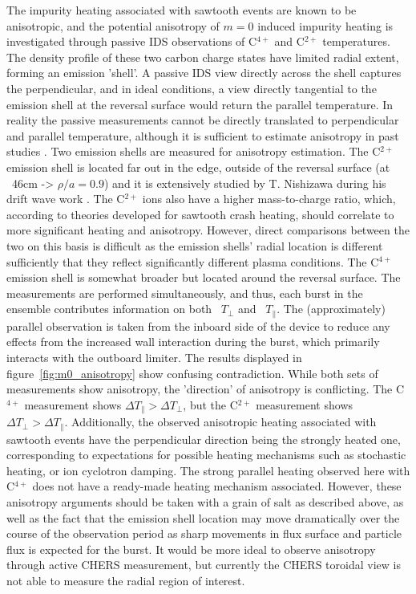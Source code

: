 \begin{refsection}
The impurity heating associated with sawtooth events are known to be anisotropic, and the potential anisotropy of $m = 0$ induced impurity heating is investigated through passive IDS observations of C$^{4+}$ and C$^{2+}$ temperatures. The density profile of these two carbon charge states have limited radial extent, forming an emission 'shell'. A passive IDS view directly across the shell captures the perpendicular, and in ideal conditions, a view directly tangential to the emission shell at the reversal surface would return the parallel temperature. In reality the passive measurements cannot be directly translated to perpendicular and parallel temperature, although it is sufficient to estimate anisotropy in past studies \cite{Anisotropy_papers}. Two emission shells are measured for anisotropy estimation. The C$^{2+}$ emission shell is located far out in the edge, outside of the reversal surface (at ~46cm -> $\rho/a = 0.9$) and it is extensively studied by T. Nishizawa during his drift wave work \cite{Nishizawa2018, Nishizawa2018b}. The C$^{2+}$ ions also have a higher mass-to-charge ratio, which, according to theories developed for sawtooth crash heating, should correlate to more significant heating and anisotropy\cite{Fiksel2009,Tangri}. However, direct comparisons between the two on this basis is difficult as the emission shells' radial location is different sufficiently that they reflect significantly different plasma conditions. The C$^{4+}$ emission shell is somewhat broader but located around the reversal surface. The measurements are performed simultaneously, and thus, each burst in the ensemble contributes information on both ~$T_{\perp}$ and ~$T_{\parallel}$. The (approximately) parallel observation is taken from the inboard side of the device to reduce any effects from the increased wall interaction during the burst, which primarily interacts with the outboard limiter. The results displayed in figure~\ref{fig:m0_anisotropy} show confusing contradiction. While both sets of measurements show anisotropy, the 'direction' of anisotropy is conflicting. The C$^{4+}$ measurement shows $\Delta T_{\parallel} > \Delta T_{\perp}$, but the C$^{2+}$ measurement shows $\Delta T_{\perp} > \Delta T_{\parallel}$. Additionally, the observed anisotropic heating associated with sawtooth events have the perpendicular direction being the strongly heated one, corresponding to expectations for possible heating mechanisms such as stochastic heating, or ion cyclotron damping. The strong parallel heating observed here with C$^{4+}$ does not have a ready-made heating mechanism associated. However, these anisotropy arguments should be taken with a grain of salt as described above, as well as the fact that the emission shell location may move dramatically over the course of the observation period as sharp movements in flux surface and particle flux is expected for the burst. It would be more ideal to observe anisotropy through active CHERS measurement, but currently the CHERS toroidal view is not able to measure the radial region of interest. 


\end{refsection}
